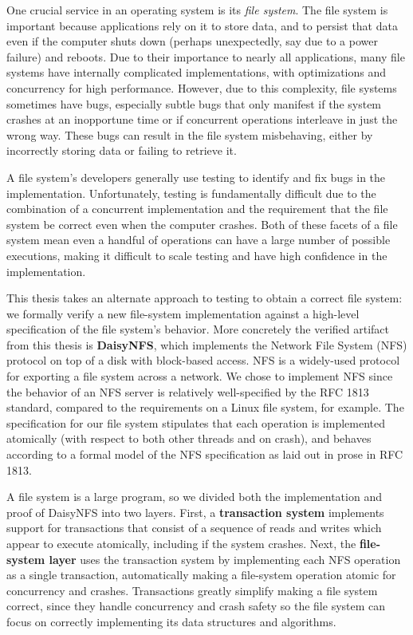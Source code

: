 One crucial service in an operating system is its \emph{file system}. The file
system is important because applications rely on it to store data, and to
persist that data even if the computer shuts down (perhaps unexpectedly, say due
to a power failure) and reboots. Due to their importance to nearly all applications, many
file systems have internally complicated implementations, with optimizations and
concurrency for high performance. However, due to this complexity, file systems
sometimes have bugs, especially subtle bugs that only manifest if the system
crashes at an inopportune time or if concurrent operations interleave in just
the wrong way. These bugs can result in the file system misbehaving, either by
incorrectly storing data or failing to retrieve it.

A file system's developers generally use testing to identify and fix bugs in the
implementation. Unfortunately, testing is fundamentally difficult due to the
combination of a concurrent implementation and the requirement that the file
system be correct even when the computer crashes. Both of these facets of a file
system mean even a handful of operations can have a large number of possible
executions, making it difficult to scale testing and have high confidence in the
implementation.

This thesis takes an alternate approach to testing to obtain a correct file
system: we formally verify a new file-system implementation against a high-level
specification of the file system's behavior. More concretely the verified
artifact from this thesis is \textbf{DaisyNFS}, which implements the Network
File System (NFS) protocol on top of a disk with block-based access. NFS is a
widely-used protocol for exporting a file system across a network. We chose to
implement NFS since the behavior of an NFS server is relatively well-specified
by the RFC 1813 standard, compared to the requirements on a Linux file system,
for example. The specification for our file system stipulates that each
operation is implemented atomically (with respect to both other threads and on
crash), and behaves according to a formal model of the NFS specification as laid
out in prose in RFC 1813.

A file system is a large program, so we divided both the implementation
and proof of DaisyNFS into two layers. First, a \textbf{transaction
system} implements support for transactions that consist of a sequence
of reads and writes which appear to execute atomically, including if the
system crashes. Next, the \textbf{file-system layer} uses the
transaction system by implementing each NFS operation as a single
transaction, automatically making a file-system operation atomic for
concurrency and crashes. Transactions greatly simplify making a file
system correct, since they handle concurrency and crash safety so the
file system can focus on correctly implementing its data structures and
algorithms.

